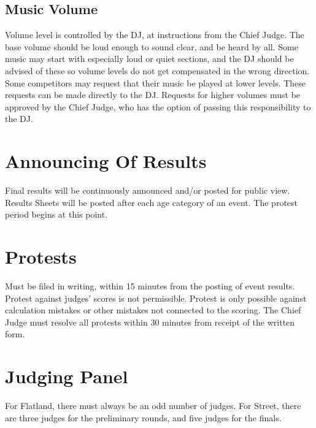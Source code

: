 \subsection{Music Volume}
Volume level is controlled by the DJ, at instructions from the Chief Judge. The base volume should be loud enough to sound clear, and be heard by all. Some music may start with especially loud or quiet sections, and the DJ should be advised of these so volume levels do not get compensated in the wrong direction. Some competitors may request that their music be played at lower levels. These requests can be made directly to the DJ. Requests for higher volumes must be approved by the Chief Judge, who has the option of passing this responsibility to the DJ.

\section{Announcing Of Results}
Final results will be continuously announced and/or posted for public view. Results Sheets will be posted after each age category of an event. The protest period begins at this point.

\section{Protests}
Must be filed in writing, within 15 minutes from the posting of event results. Protest against judges’ scores is not permissible. Protest is only possible against calculation mistakes or other mistakes not connected to the scoring. The Chief Judge must resolve all protests within 30 minutes from receipt of the written form.

\section{Judging Panel}
For Flatland, there must always be an odd number of judges. For Street, there are three judges for the preliminary rounds, and five judges for the finals.

